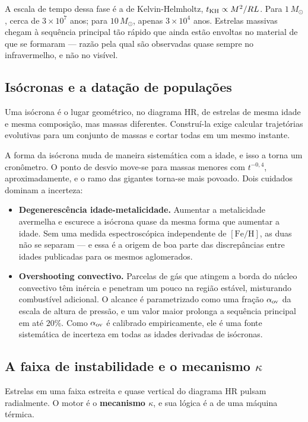 \documentclass[11pt,a4paper]{article}
\begin{document}
A escala de tempo dessa fase é a de Kelvin-Helmholtz, $t_{\rm KH}\propto M^{2}/RL$. Para $1\,M_\odot$, cerca de $3\times10^{7}$ anos; para $10\,M_\odot$, apenas $3\times10^{4}$ anos. Estrelas massivas chegam à sequência principal tão rápido que ainda estão envoltas no material de que se formaram --- razão pela qual são observadas quase sempre no infravermelho, e não no visível.

\subsection*{Isócronas e a datação de populações}

Uma isócrona é o lugar geométrico, no diagrama HR, de estrelas de mesma idade e mesma composição, mas massas diferentes. Construí-la exige calcular trajetórias evolutivas para um conjunto de massas e cortar todas em um mesmo instante.

A forma da isócrona muda de maneira sistemática com a idade, e isso a torna um cronômetro. O ponto de desvio move-se para massas menores com $t^{-0{,}4}$, aproximadamente, e o ramo das gigantes torna-se mais povoado. Dois cuidados dominam a incerteza:

\begin{itemize}
\item \textbf{Degenerescência idade-metalicidade.} Aumentar a metalicidade avermelha e escurece a isócrona quase da mesma forma que aumentar a idade. Sem uma medida espectroscópica independente de $[\mathrm{Fe/H}]$, as duas não se separam --- e essa é a origem de boa parte das discrepâncias entre idades publicadas para os mesmos aglomerados.
\item \textbf{Overshooting convectivo.} Parcelas de gás que atingem a borda do núcleo convectivo têm inércia e penetram um pouco na região estável, misturando combustível adicional. O alcance é parametrizado como uma fração $\alpha_{\rm ov}$ da escala de altura de pressão, e um valor maior prolonga a sequência principal em até $20\%$. Como $\alpha_{\rm ov}$ é calibrado empiricamente, ele é uma fonte sistemática de incerteza em todas as idades derivadas de isócronas.
\end{itemize}

\subsection*{A faixa de instabilidade e o mecanismo $\kappa$}

Estrelas em uma faixa estreita e quase vertical do diagrama HR pulsam radialmente. O motor é o \textbf{mecanismo $\kappa$}, e sua lógica é a de uma máquina térmica.
\end{document}
